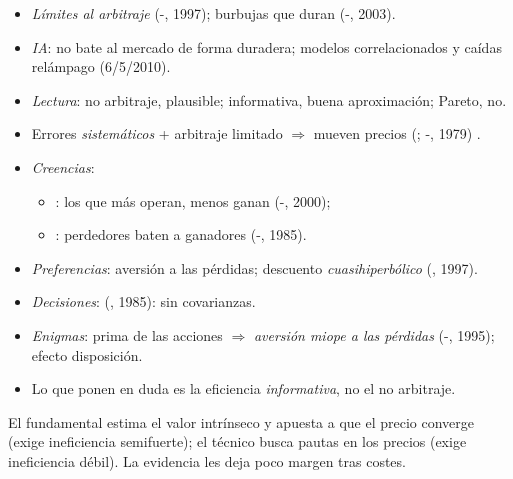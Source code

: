 \documentclass{article}
\begin{document}
\begin{columnas}
\begin{itemize}
\begin{itemize}
  \item exceso de volatilidad (, 1981); anomalías (tamaño, valor, \emph{momentum}, burbujas).
  \end{itemize}
\item \emph{Límites al arbitraje} (-, 1997); burbujas que duran (-, 2003).
\item \emph{IA}: no bate al mercado de forma duradera; modelos correlacionados y caídas relámpago (6/5/2010).
\item \emph{Lectura}: no arbitraje, plausible; informativa, buena aproximación; Pareto, no.
\end{itemize}

\begin{itemize}
\item Errores \emph{sistemáticos} + arbitraje limitado $\Rightarrow$ mueven precios (; -, 1979) .
\item \emph{Creencias}:
  \begin{itemize}
  \item {}: los que más operan, menos ganan (-, 2000);
  \item {}: perdedores baten a ganadores (-, 1985).
  \end{itemize}
\item \emph{Preferencias}: aversión a las pérdidas; descuento \emph{cuasihiperbólico} (, 1997).
\item \emph{Decisiones}:  (, 1985): sin covarianzas.
\item \emph{Enigmas}: prima de las acciones $\Rightarrow$ \emph{aversión miope a las pérdidas} (-, 1995); efecto disposición.
\item Lo que ponen en duda es la eficiencia \emph{informativa}, no el no arbitraje.
\end{itemize}

\begin{ideaclave}
El fundamental estima el valor intrínseco y apuesta a que el precio converge (exige ineficiencia semifuerte); el técnico busca pautas en los precios (exige ineficiencia débil). La evidencia les deja poco margen tras costes.
\end{ideaclave}


\end{columnas}
\end{document}
